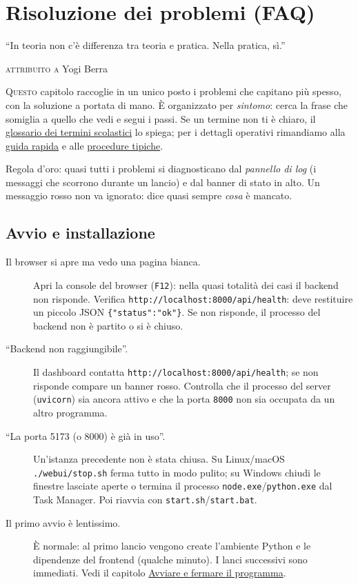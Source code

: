 \chapter{Risoluzione dei problemi (FAQ)}
\label{ch:faq}

\epigraph{``In teoria non c'\`e differenza tra teoria e pratica.
Nella pratica, s\`i.''}{\textsc{attribuito a} Yogi Berra}

\lettrine[lines=3]{Q}{uesto} capitolo raccoglie in un unico posto
i problemi che capitano pi\`u spesso, con la soluzione a portata
di mano. \`E organizzato per \emph{sintomo}: cerca la frase che
somiglia a quello che vedi e segui i passi. Se un termine non ti
\`e chiaro, il \hyperref[ch:terminologia_didattica]{glossario dei
termini scolastici} lo spiega; per i dettagli operativi rimandiamo
alla \hyperref[ch:getting_started]{guida rapida} e alle
\hyperref[ch:workflow_tipici]{procedure tipiche}.

\begin{avvertenzabox}
Regola d'oro: quasi tutti i problemi si diagnosticano dal
\emph{pannello di log} (i messaggi che scorrono durante un
lancio) e dal banner di stato in alto. Un messaggio rosso non
va ignorato: dice quasi sempre \emph{cosa} \`e mancato.
\end{avvertenzabox}

\section{Avvio e installazione}

\begin{description}

\item[Il browser si apre ma vedo una pagina bianca.]
Apri la console del browser (\texttt{F12}): nella quasi totalit\`a
dei casi il backend non risponde. Verifica
\texttt{http://localhost:8000/api/health}: deve restituire un
piccolo JSON \texttt{\{"status":"ok"\}}. Se non risponde, il
processo del backend non \`e partito o si \`e chiuso.

\item[``Backend non raggiungibile''.]
Il dashboard contatta \texttt{http://localhost:8000/api/health};
se non risponde compare un banner rosso. Controlla che il
processo del server (\texttt{uvicorn}) sia ancora attivo e che
la porta \texttt{8000} non sia occupata da un altro programma.

\item[``La porta 5173 (o 8000) \`e gi\`a in uso''.]
Un'istanza precedente non \`e stata chiusa. Su Linux/macOS
\texttt{./webui/stop.sh} ferma tutto in modo pulito; su Windows
chiudi le finestre lasciate aperte o termina il processo
\texttt{node.exe}/\texttt{python.exe} dal Task Manager. Poi
riavvia con \texttt{start.sh}/\texttt{start.bat}.

\item[Il primo avvio \`e lentissimo.]
\`E normale: al primo lancio vengono create l'ambiente Python e
le dipendenze del frontend (qualche minuto). I lanci successivi
sono immediati. Vedi il capitolo \hyperref[ch:launcher]{Avviare e
fermare il programma}.

\end{description}


